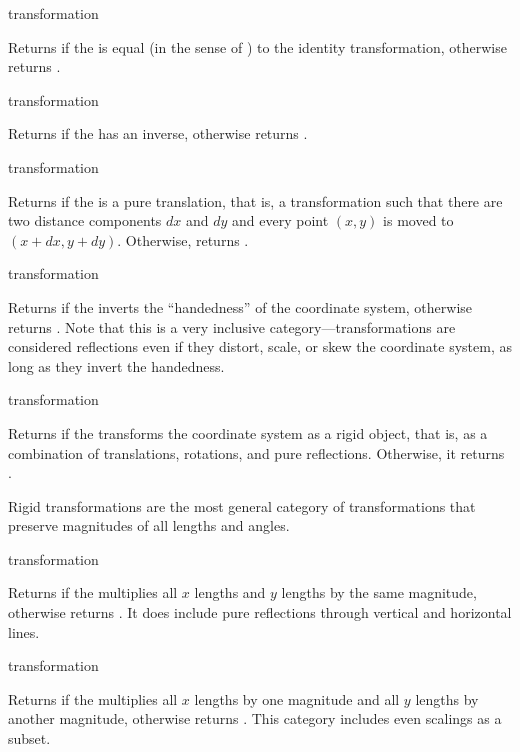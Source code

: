  {transformation} 

Returns  if the   is equal
(in the sense of ) to the identity transformation,
otherwise returns .

 {transformation} 

Returns  if the   has an
inverse, otherwise returns .

 {transformation}

Returns  if the   is a pure
translation, that is, a transformation such that there are two distance
components $dx$ and $dy$ and every point $(x,y)$ is moved to $(x+dx,y+dy)$.
Otherwise,  returns .

 {transformation}

Returns  if the   inverts
the ``handedness'' of the coordinate system, otherwise returns .
Note that this is a very inclusive category---transformations are considered
reflections even if they distort, scale, or skew the coordinate system, as long
as they invert the handedness.

 {transformation}

Returns  if the   transforms
the coordinate system as a rigid object, that is, as a combination of
translations, rotations, and pure reflections.  Otherwise, it returns
.

Rigid transformations are the most general category of transformations that
preserve magnitudes of all lengths and angles.

 {transformation}

Returns  if the   multiplies
all $x$ lengths and $y$ lengths by the same magnitude, otherwise returns
.  It does include pure reflections through vertical and horizontal
lines.

 {transformation}

Returns  if the   multiplies
all $x$ lengths by one magnitude and all $y$ lengths by another magnitude,
otherwise returns .  This category includes even scalings as a
subset.

